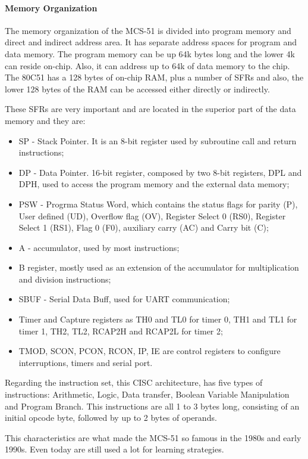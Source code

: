\paragraph{Memory Organization} The memory organization of the MCS-51 is divided into program memory and direct and indirect address area. It has separate address spaces for program and data memory. The program memory can be up 64k bytes long and the lower 4k can reside on-chip. Also, it can address up to 64k of data memory to the chip. The 80C51 has a 128 bytes of on-chip RAM, plus a number of SFRs and also, the lower 128 bytes of the RAM can be accessed either directly or indirectly.
\par These SFRs are very important and are located in the superior part of the data memory and they are:
\begin{itemize}
	\item SP - Stack Pointer. It is an 8-bit register used by subroutine call and return instructions;
	\item DP - Data Pointer. 16-bit register, composed by two 8-bit registers, DPL and DPH, used to access the program memory and the external data memory;
	\item PSW - Progrma Status Word, which contains the status flags for parity (P), User defined (UD), Overflow flag (OV), Register Select 0 (RS0), Register Select 1 (RS1), Flag 0 (F0), auxiliary carry (AC) and Carry bit (C);
	\item A - accumulator, used by most instructions;
	\item B register, mostly used as an extension of the accumulator for multiplication and division instructions;
	\item SBUF - Serial Data Buff, used for UART communication;
	\item Timer and Capture registers as TH0 and TL0 for timer 0, TH1 and TL1 for timer 1, TH2, TL2, RCAP2H and RCAP2L for timer 2;
	\item TMOD, SCON, PCON, RCON, IP, IE are control registers to configure interruptions, timers and serial port. 
\end{itemize}
\par Regarding the instruction set, this CISC architecture, has five types of instructions: Arithmetic, Logic, Data transfer, Boolean Variable Manipulation and Program Branch. This instructions are all 1 to 3 bytes long, consisting of an initial opcode byte, followed by up to 2 bytes of operands.
\par This characteristics are what made the MCS-51 so famous in the 1980s and early 1990s. Even today are still used a lot for learning strategies.
